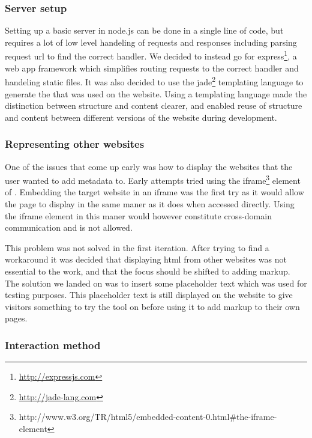 \subsubsection{Server setup}
Setting up a basic server in node.js can be done in a single line of code,
but requires a lot of low level handeling of requests and responses
including parsing request url to find the correct handler.
We decided to instead go for express\footnote{\url{http://expressjs.com}},
a web app framework which simplifies routing requests to the correct handler and handeling static files.
It was also decided to use the jade\footnote{\url{http://jade-lang.com}}
templating language to generate the  that was used on the website.
Using a templating language made the distinction between structure and content clearer,
and enabled reuse of structure and content between different versions of the website during development.


\subsubsection{Representing other websites}
One of the issues that come up early was how to display the websites that the user wanted to add metadata to.
Early attempts tried using the iframe\footnote{http://www.w3.org/TR/html5/embedded-content-0.html\#the-iframe-element}
element of .
Embedding the target website in an iframe was the first try as it would allow the page to display in the same maner
as it does when accessed directly.
Using the iframe element in this maner would however constitute cross-domain communication and is not allowed.

This problem was not solved in the first iteration.
After trying to find a workaround it was decided that displaying html from other websites was not essential to the work,
and that the focus should be shifted to adding markup.
The solution we landed on was to insert some placeholder text which was used for testing purposes.
This placeholder text is still displayed on the website to give visitors something to try the tool on before using it
to add markup to their own pages.

\subsubsection{Interaction method}



